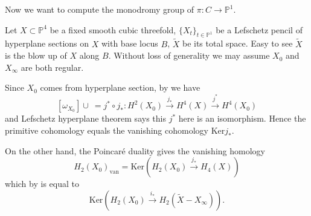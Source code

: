 \documentclass{article}
\begin{document}
Now we want to compute the monodromy group of $\pi \colon C \to \mathbb P^1$.

Let $X\subset \mathbb P^4$ be a fixed smooth cubic threefold, $\{X_t\}_{t\in \mathbb P^1}$ be a Lefschetz pencil of hyperplane sections on $X$ with base locus $B$, $\tilde X$ be its total space. Easy to see $\tilde X$ is the blow up of $X$ along $B$. Without loss of generality we may assume $X_0$ and $X_\infty$ are both regular. 



Since $X_0$ comes from hyperplane section, by \cite[Equation (1.5)]{V} we have
$$[\omega_{X_0}] \cup ~ =j^*\circ j_*\colon  H^{2}(X_0) \xrightarrow{j_*}  H^{4}(X) \xrightarrow{j^*}  H^{4}(X_0) $$
and Lefschetz hyperplane theorem says this $j^*$ here is an isomorphism. Hence the primitive cohomology equals the vanishing cohomology $\text{Ker}j_*$.

On the other hand, the Poincar\'{e} duality gives the vanishing homology
$$H_{2}(X_0)_\text{van}=\text{Ker}(H_{2}(X_0) \xrightarrow{j_*}  H_{4}(X))$$
which by \cite[Lemma 2.26]{V} is equal to
$$\text{Ker}(H_{2}(X_0) \xrightarrow{i_*}  H_{2}(\tilde X-X_\infty)) \text{.}$$
\end{document}
